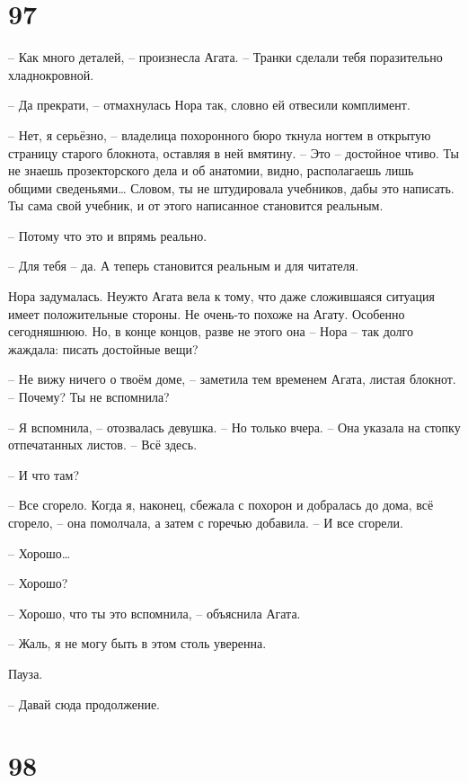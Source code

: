 \documentclass[
  a5paperpaper,
  DIV=11,
  numbers=noendperiod]{scrreprt}
\begin{document}
\section*{97}\label{97}


-- Как много деталей, -- произнесла Агата. -- Транки сделали тебя
поразительно хладнокровной.

-- Да прекрати, -- отмахнулась Нора так, словно ей отвесили комплимент.

-- Нет, я серьёзно, -- владелица похоронного бюро ткнула ногтем в
открытую страницу старого блокнота, оставляя в ней вмятину. -- Это --
достойное чтиво. Ты не знаешь прозекторского дела и об анатомии, видно,
располагаешь лишь общими сведеньями\ldots{} Словом, ты не штудировала
учебников, дабы это написать. Ты сама свой учебник, и от этого
написанное становится реальным.

-- Потому что это и впрямь реально.

-- Для тебя -- да. А теперь становится реальным и для читателя.

Нора задумалась. Неужто Агата вела к тому, что даже сложившаяся ситуация
имеет положительные стороны. Не очень-то похоже на Агату. Особенно
сегодняшнюю. Но, в конце концов, разве не этого она -- Нора -- так долго
жаждала: писать достойные вещи?

-- Не вижу ничего о твоём доме, -- заметила тем временем Агата, листая
блокнот. -- Почему? Ты не вспомнила?

-- Я вспомнила, -- отозвалась девушка. -- Но только вчера. -- Она
указала на стопку отпечатанных листов. -- Всё здесь.

-- И что там?

-- Все сгорело. Когда я, наконец, сбежала с похорон и добралась до дома,
всё сгорело, -- она помолчала, а затем с горечью добавила. -- И все
сгорели.

-- Хорошо\ldots{}

-- Хорошо?

-- Хорошо, что ты это вспомнила, -- объяснила Агата.

-- Жаль, я не могу быть в этом столь уверенна.

Пауза.

-- Давай сюда продолжение.

\section*{98}\label{98}
\end{document}
